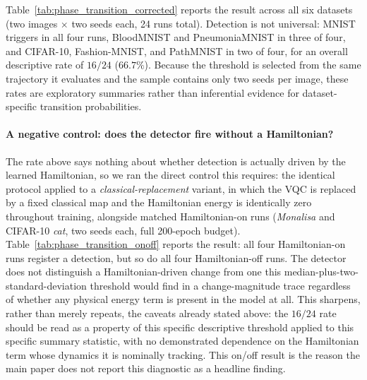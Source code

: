 \documentclass[11pt]{article}
\begin{document}
Table~\ref{tab:phase_transition_corrected} reports the result across all six datasets (two images $\times$ two seeds each, 24 runs total). Detection is not universal: MNIST triggers in all four runs, BloodMNIST and PneumoniaMNIST in three of four, and CIFAR-10, Fashion-MNIST, and PathMNIST in two of four, for an overall descriptive rate of $16/24$ ($66.7\%$). Because the threshold is selected from the same trajectory it evaluates and the sample contains only two seeds per image, these rates are exploratory summaries rather than inferential evidence for dataset-specific transition probabilities.

\paragraph{A negative control: does the detector fire without a Hamiltonian?} The rate above says nothing about whether detection is actually driven by the learned Hamiltonian, so we ran the direct control this requires: the identical protocol applied to a \emph{classical-replacement} variant, in which the VQC is replaced by a fixed classical map and the Hamiltonian energy is identically zero throughout training, alongside matched Hamiltonian-on runs (\textit{Monalisa} and CIFAR-10 \textit{cat}, two seeds each, full 200-epoch budget). Table~\ref{tab:phase_transition_onoff} reports the result: all four Hamiltonian-on runs register a detection, but so do all four Hamiltonian-off runs. The detector does not distinguish a Hamiltonian-driven change from one this median-plus-two-standard-deviation threshold would find in a change-magnitude trace regardless of whether any physical energy term is present in the model at all. This sharpens, rather than merely repeats, the caveats already stated above: the $16/24$ rate should be read as a property of this specific descriptive threshold applied to this specific summary statistic, with no demonstrated dependence on the Hamiltonian term whose dynamics it is nominally tracking. This on/off result is the reason the main paper does not report this diagnostic as a headline finding.
\end{document}
